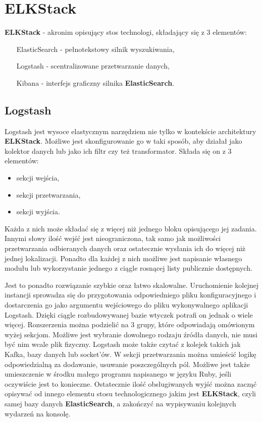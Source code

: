 \section{ELKStack}
\label{chapter:application:elkstack}

\textbf{ELKStack} - akronim opisujący stos technologi, składający się z 3 elementów:
\begin{itemize}
    \item[ElasticSearch] - pełnotekstowy silnik wyszukiwania,
    \item[Logstash] - scentralizowane przetwarzanie danych,
    \item[Kibana] - interfejs graficzny silnika \textbf{ElasticSearch}.
\end{itemize}

\subsection{Logstash}
    Logstash jest wysoce elastycznym narzędziem nie tylko w kontekście architektury \textbf{ELKStack}.
    Możliwe jest skonfigurowanie go w taki sposób, aby działał jako kolektor danych lub jako ich filtr czy też
    transformator. Składa się on z 3 elementów:
    \begin{itemize}
        \item sekcji wejścia,
        \item sekcji przetwarzania,
        \item sekcji wyjścia.
    \end{itemize}
    Każda z nich może składać się z więcej niż jednego bloku opisującego jej zadania.
    Innymi słowy ilość wejść jest nieograniczona, tak samo jak możliwości przetwarzania
    odbieranych danych oraz ostatecznie wysłania ich do więcej niż jednej lokalizacji.
    Ponadto dla każdej z nich możliwe jest napisanie własnego modułu lub wykorzystanie
    jednego z ciągle rosnącej listy publicznie dostępnych.
    
    Jest to ponadto rozwiązanie szybkie oraz łatwo skalowalne. Uruchomienie kolejnej
    instancji sprowadza się do przygotowania odpowiedniego pliku konfiguracyjnego
    i dostarczenia go jako argumentu wejściowego do pliku wykonywalnego aplikacji Logstash.
    Dzięki ciągle rozbudowywanej bazie wtyczek potrafi on jednak o wiele więcej. 
    Rozszerzenia można podzielić na 3 grupy, które odpowiadają omówionym wyżej sekcjom.
    Możliwe jest wybranie dowolnego rodzaju źródła danych, nie musi być nim wcale plik fizyczny.
    Logstash może także czytać z kolejek takich jak Kafka, bazy danych lub socket'ów.
    W sekcji przetwarzania można umieścić logikę odpowiedzialną za dodawanie, usuwanie poszczególnych
    pól. Możliwe jest także umieszczenie w środku małego programu napisanego w języku Ruby, jeśli oczywiście
    jest to konieczne. Ostatecznie ilość obsługiwanych wyjść można zacząć opisywać od innego
    elementu stosu technologicznego jakim jest \textbf{ELKStack}, czyli samej bazy danych
    \textbf{ElasticSearch}, a zakończyć na wypisywaniu kolejnych wydarzeń na konsolę. 

